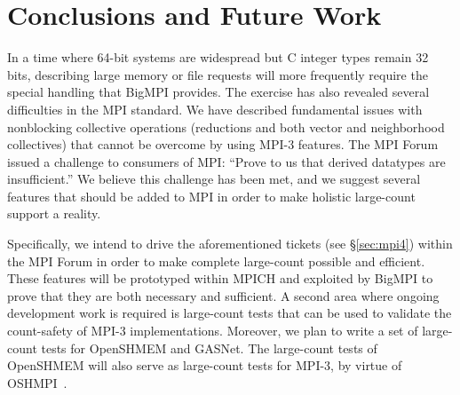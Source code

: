 
\section{Conclusions and Future Work}

In a time where 64-bit systems are widespread
but C integer types remain 32 bits, describing large memory or file requests
will more frequently require the special handling that BigMPI provides.
The exercise has also revealed several difficulties in the MPI standard.
We have described fundamental issues with nonblocking
collective operations (reductions and both vector and neighborhood collectives)
that cannot be overcome by using MPI-3 features.
The MPI Forum issued a challenge to consumers of MPI:
``Prove to us that derived datatypes are insufficient.''
We believe this challenge has been met, and we suggest 
several features
that should be added to MPI in order to make holistic large-count support a reality.

Specifically, we intend to drive the aforementioned tickets
(see \S\ref{sec:mpi4}) within the MPI Forum
in order to make complete large-count possible and efficient.
These features will be prototyped within MPICH and exploited by
BigMPI to prove that they are both necessary and sufficient.
A second area where ongoing development work is required is 
large-count tests that can be used to validate the count-safety of
MPI-3 implementations.
Moreover, we plan to write a set of large-count tests for 
OpenSHMEM and GASNet.  The large-count tests of OpenSHMEM
will also serve as large-count tests for MPI-3, by virtue of 
OSHMPI~\cite{hammond2014implementing}.
